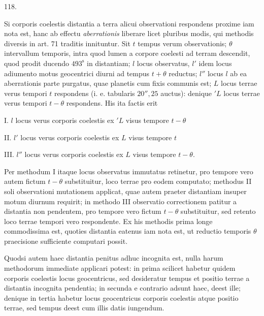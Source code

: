 \par\medskip
\begin{center}\hypertarget{native-164-article118}{}118.\end{center}
Si corporis coelestis distantia a terra alicui observationi respondens proxime iam nota est, hanc ab effectu \emph{aberrationis} liberare licet pluribus modis, qui methodis diversis in art. 71 traditis innituntur. Sit $t$ tempus verum observationis; $\theta$ intervallum temporis, intra quod lumen a corpore coelesti ad terram descendit, quod prodit ducendo $493^{\mathrm{s}}$ in distantiam; $l$ locus observatus, $l'$ idem locus adiumento motus geocentrici diurni ad tempus $t+\theta$ reductus; $l''$ locus $l$ ab ea aberrationis parte purgatus, quae planetis cum fixis communis est; $L$ locus terrae verus tempori $t$ respondens (i. e. tabularis $20''{,}25$ auctus): denique ${}'L$ locus terrae verus tempori $t-\theta$ respondens. His ita factis erit
\par I. $l$ locus verus corporis coelestis ex ${}'L$ visus tempore $t-\theta$
\par II. $l'$ locus verus corporis coelestis ex $L$ visus tempore $t$
\par III. $l''$ locus verus corporis coelestis ex $L$ visus tempore $t-\theta$.
\par\noindent Per methodum I itaque locus observatus immutatus retinetur, pro tempore vero autem fictum $t-\theta$ substituitur, loco terrae pro eodem computato; methodus II soli observationi mutationem applicat, quae autem praeter distantiam insuper motum diurnum requirit; in methodo III observatio correctionem patitur a distantia non pendentem, pro tempore vero fictum $t-\theta$ substituitur, sed retento loco terrae tempori vero respondente. Ex his methodis prima longe commodissima est, quoties distantia eatenus iam nota est, ut reductio temporis $\theta$ praecisione sufficiente computari possit.

Quodsi autem haec distantia penitus adhuc incognita est, nulla harum methodorum immediate applicari potest: in prima scilicet habetur quidem corporis coelestis locus geocentricus, sed desideratur tempus et positio terrae a distantia incognita pendentia; in secunda e contrario adsunt haec, deest ille; denique in tertia habetur locus geocentricus corporis coelestis atque positio terrae, sed tempus deest cum illis datis iungendum.

